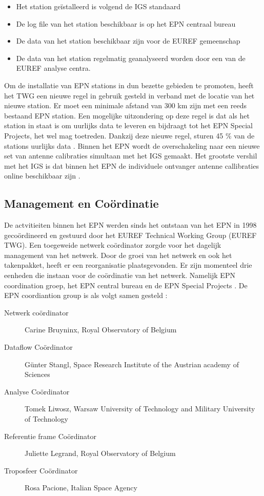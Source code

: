 \begin{itemize}
	\item Het station ge\"istalleerd is volgend de IGS standaard
	\item De log file van het station beschikbaar is op het EPN centraal bureau
	\item De data van het station beschikbaar zijn voor de EUREF gemeenschap
	\item De data van het station regelmatig geanalyseerd worden door een van de EUREF analyse centra. 
\end{itemize} 
Om de installatie van EPN stations in dun bezette gebieden te promoten, heeft het TWG een nieuwe regel in gebruik gesteld in verband met de locatie van het nieuwe station. Er moet een minimale afstand van 300 km zijn met een reeds bestaand EPN station. Een mogelijke uitzondering op deze regel is dat als het station in staat is om uurlijks data te leveren en bijdraagt tot het EPN Special Projects, het wel mag toetreden. Dankzij deze nieuwe regel, sturen 45 \% van de stations uurlijks data \cite{LBibEPN6}. Binnen het EPN wordt de overschakeling naar een nieuwe set van antenne calibraties simultaan met het IGS gemaakt. Het grootste vershil met het IGS is dat binnen het EPN de individuele ontvanger antenne callibraties online beschikbaar zijn \cite{LBibEPN4}.

\subsection{Management en Co\"ordinatie}
De actvitieiten binnen het EPN werden sinds het ontstaan van het EPN in 1998 geco\"ordineerd en gestuurd door het EUREF Technical Working Group (EUREF TWG). Een toegeweide netwerk co\"ordinator zorgde voor het dagelijk management van het netwerk. Door de groei van het netwerk en ook het takenpakket, heeft er een reorganisatie plaatsgevonden. Er zijn momenteel drie eenheden die instaan voor de co\"ordinatie van het netwerk. Namelijk EPN coordination groep, het EPN central bureau en de EPN Special Projects \cite{LBibEPN6}. 
De EPN coordiantion group is als volgt samen gesteld \cite{LBibEPN8}:
\begin{description}
	\item[Netwerk co\"ordinator] Carine Bruyninx, Royal Observatory of Belgium
	\item[Dataflow Co\"ordinator] G\"unter Stangl, Space Research Institute of the Austrian academy of Sciences
	\item[Analyse Co\"ordinator] Tomek Liwosz, Warsaw University of Technology and Military University of Technology
	\item[Referentie frame Co\"ordinator] Juliette Legrand, Royal Observatory of Belgium
	\item[Troposfeer Co\"ordinator] Rosa Pacione, Italian Space Agency
\end{description}

